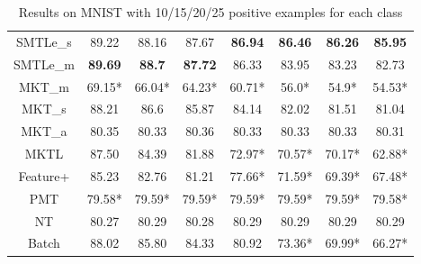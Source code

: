 \begin{table*}[h]
{{\begin{tabular}{|c|c|c|c|c|c|c|c|}
      SMTLe\_s & 89.22 & 88.16 & 87.67 & \textbf{86.94} & \textbf{86.46} & \textbf{86.26} & \textbf{85.95}\\ 
      SMTLe\_m & \textbf{89.69} & \textbf{88.7} & \textbf{87.72} & 86.33 & 83.95 & 83.23 & 82.73\\ 
      MKT\_{m} & 69.15* & 66.04* & 64.23* & 60.71* & 56.0* & 54.9* & 54.53*\\ 
      MKT\_{s} & 88.21 & 86.6 & 85.87 & 84.14 & 82.02 & 81.51 & 81.04\\ 
      MKT\_{a} & 80.35 & 80.33 & 80.36 & 80.33 & 80.33 & 80.33 & 80.31\\ 
      MKTL & 87.50 & 84.39 & 81.88 & 72.97* & 70.57* & 70.17* & 62.88*\\ 
      Feature+ & 85.23 & 82.76 & 81.21 & 77.66* & 71.59* & 69.39* & 67.48*\\ 
      PMT & 79.58* & 79.59* & 79.59* & 79.59* & 79.59* & 79.59* & 79.58*\\ 
      NT & 80.27 & 80.29 & 80.28 & 80.29 & 80.29 & 80.29 & 80.29\\ 
      Batch & 88.02 & 85.80 & 84.33 & 80.92 & 73.36* & 69.99* & 66.27*\\ 
\hline\end{tabular}}}\caption{Results on MNIST with 10/15/20/25 positive examples for each class}\label{tab:mnist}
\end{table*}




